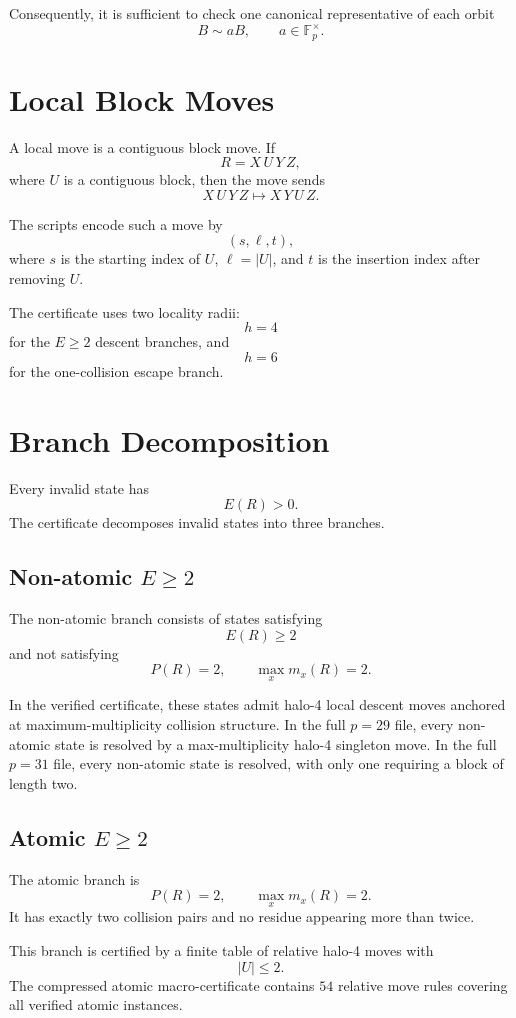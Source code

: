 \documentclass[11pt]{article}
\newcommand{\Fpx}{\mathbb{F}_p^\times}
\begin{document}
Consequently, it is sufficient to check one canonical representative of each orbit
\[
B\sim aB,\qquad a\in\Fpx.
\]

\section{Local Block Moves}

A local move is a contiguous block move. If
\[
R=X\,U\,Y\,Z,
\]
where \(U\) is a contiguous block, then the move sends
\[
X\,U\,Y\,Z\longmapsto X\,Y\,U\,Z.
\]

The scripts encode such a move by
\[
(s,\ell,t),
\]
where \(s\) is the starting index of \(U\), \(\ell=|U|\), and \(t\) is the insertion index after removing \(U\).

The certificate uses two locality radii:
\[
h=4
\]
for the \(E\ge2\) descent branches, and
\[
h=6
\]
for the one-collision escape branch.

\section{Branch Decomposition}

Every invalid state has
\[
E(R)>0.
\]
The certificate decomposes invalid states into three branches.

\subsection{Non-atomic \(E\ge2\)}

The non-atomic branch consists of states satisfying
\[
E(R)\ge2
\]
and not satisfying
\[
P(R)=2,\qquad \max_xm_x(R)=2.
\]

In the verified certificate, these states admit halo-4 local descent moves anchored at maximum-multiplicity collision structure. In the full \(p=29\) file, every non-atomic state is resolved by a max-multiplicity halo-4 singleton move. In the full \(p=31\) file, every non-atomic state is resolved, with only one requiring a block of length two.

\subsection{Atomic \(E\ge2\)}

The atomic branch is
\[
P(R)=2,\qquad \max_xm_x(R)=2.
\]
It has exactly two collision pairs and no residue appearing more than twice.

This branch is certified by a finite table of relative halo-4 moves with
\[
|U|\le2.
\]
The compressed atomic macro-certificate contains \(54\) relative move rules covering all verified atomic instances.
\end{document}
